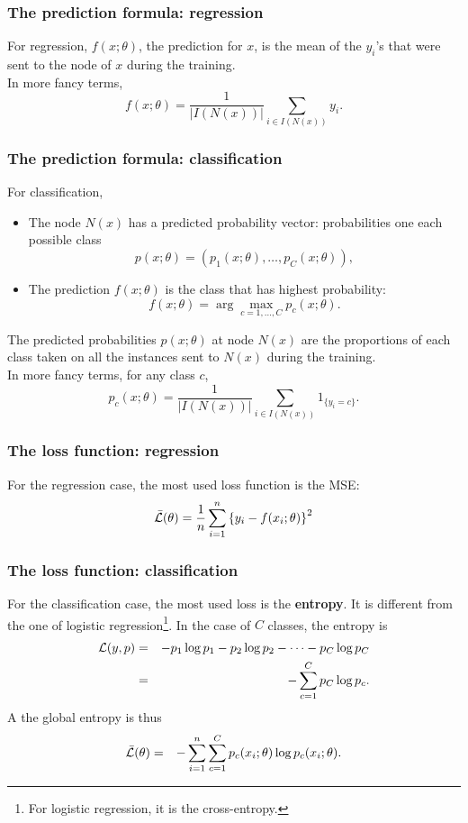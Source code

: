 \begin{frame}
\frametitle{The prediction formula: regression}
For regression, $f(x;\theta)$, the prediction for $x$, is the mean of the $y_i$'s that were sent to the node of $x$ during the training.\\
\vspace{0.3cm}
In more fancy terms, 
$$
f(x;\theta) = \frac{1}{|I(N(x))|}\sum_{i \in I(N(x))} y_i.
$$
\end{frame}
\begin{frame}
\frametitle{The prediction formula: classification}
For classification, 
\begin{itemize}
\item The node $N(x)$ has a predicted probability vector: probabilities one each possible class 
$$
p(x;\theta) = (p_1(x;\theta), \ldots, p_C(x;\theta)),
$$
\item The prediction $f(x;\theta)$ is the class that has highest probability:
$$
f(x;\theta) = \arg\max_{c=1,\ldots,C} p_c(x;\theta).
$$ 
\end{itemize}
The predicted probabilities $p(x;\theta)$ at node $N(x)$ are the proportions of each class taken on all the instances sent to $N(x)$ during the training.\\
\vspace{0.2cm}
In more fancy terms, for any class $c$,
$$
p_c(x;\theta) = \frac{1}{|I(N(x))|}\sum_{i \in I(N(x))} 1_{\{y_i = c\}}.
$$
\end{frame}
\begin{frame}
\frametitle{The loss function: regression}
For the regression case, the most used loss function is the MSE:
$$
\bar{\cal L}(\theta) = \frac{1}{n} \sum_{i=1}^n \left\{y_i - f(x_i;\theta)\right\}^2
$$
\end{frame}
\begin{frame}
\frametitle{The loss function: classification}
For the classification case, the most used loss is the {\bf entropy}. It is different from the one of logistic regression\footnote{For logistic regression, it is the cross-entropy.}. In the case of $C$ classes, the entropy is
\begin{eqnarray*}
{\cal L}(y, p) &=& - p_1 \log p_1 - p_2 \log p_2 - \cdots - p_C \log p_C\\
&=& - \sum_{c=1}^C p_C \log p_c.
\end{eqnarray*}
A the global entropy is thus
\begin{eqnarray*}
\bar{\cal L}(\theta) &=& - \sum_{i=1}^n\sum_{c=1}^C p_c(x_i;\theta) \log p_c(x_i;\theta).
\end{eqnarray*}
\end{frame}
